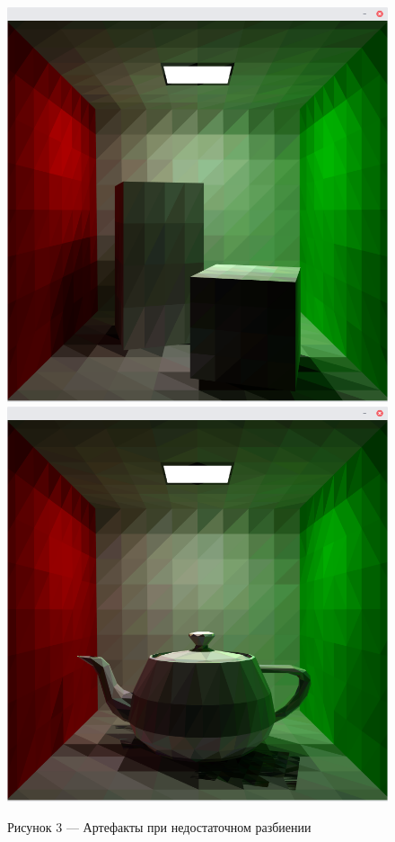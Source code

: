 \documentclass[12pt]{article}
\begin{document}
\begin{figure}[h]
\centering
\includegraphics[scale=0.3]{rad_bad1.png}
\includegraphics[scale=0.3]{rad_bad2.png}
\caption*{Рисунок 3 --- Артефакты при недостаточном разбиении}
\end{figure}
\end{document}
